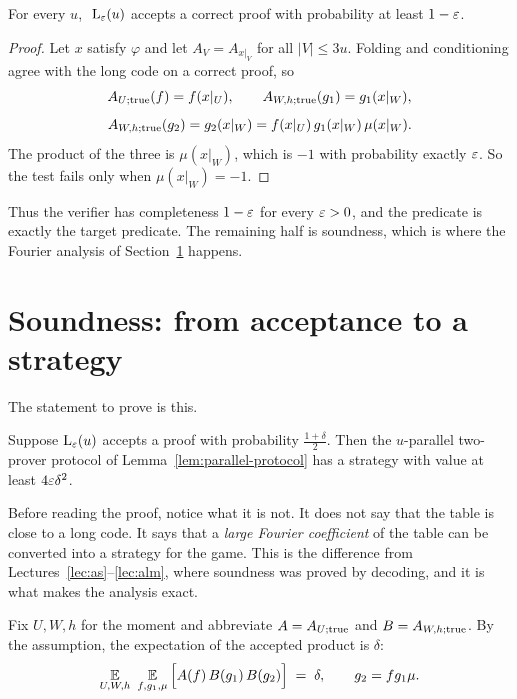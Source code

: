 \begin{lemma}\label{lem:L-complete}
For every $u$, $\ \mathrm{L}_\varepsilon(u)$ accepts a correct proof with probability at least $1-\varepsilon$.
\end{lemma}
\begin{proof}
Let $x$ satisfy $\varphi$ and let $A_V=A_{x|_V}$ for all $|V|\le3u$.  Folding and conditioning agree with the long code on a correct proof, so
\[
  A_{U;{\rm true}}(f)=f(x|_U),\qquad
  A_{W,h;{\rm true}}(g_1)=g_1(x|_W),
\]
\[
  A_{W,h;{\rm true}}(g_2)=g_2(x|_W)=f(x|_U)\,g_1(x|_W)\,\mu(x|_W).
\]
The product of the three is $\mu(x|_W)$, which is $-1$ with probability exactly $\varepsilon$.  So the test fails only when $\mu(x|_W)=-1$.
\end{proof}

\noindent
Thus the verifier has completeness $1-\varepsilon$ for every $\varepsilon>0$, and the predicate is exactly the target predicate.  The remaining half is soundness, which is where the Fourier analysis of Section~\ref{sec:soundness} happens.


\section{Soundness: from acceptance to a strategy}
\label{sec:soundness}

The statement to prove is this.

\begin{lemma}\label{lem:L-sound}
Suppose $\mathrm{L}_\varepsilon(u)$ accepts a proof with probability $\tfrac{1+\delta}{2}$.  Then the $u$-parallel two-prover protocol of Lemma~\ref{lem:parallel-protocol} has a strategy with value at least $4\varepsilon\delta^2$.
\end{lemma}

\noindent
Before reading the proof, notice what it is not.  It does not say that the table is close to a long code.  It says that a \emph{large Fourier coefficient} of the table can be converted into a strategy for the game.  This is the difference from Lectures~\ref{lec:as}--\ref{lec:alm}, where soundness was proved by decoding, and it is what makes the analysis exact.

Fix $U,W,h$ for the moment and abbreviate $A=A_{U;{\rm true}}$ and $B=A_{W,h;{\rm true}}$.  By the assumption, the expectation of the accepted product is $\delta$:
\begin{equation}\label{eq:accept}
  \operatorname*{\mathbb{E}}_{U,W,h}\ \operatorname*{\mathbb{E}}_{f,g_1,\mu}\Big[A(f)\,B(g_1)\,B(g_2)\Big]\;=\;\delta,
  \qquad g_2=fg_1\mu.
\end{equation}

